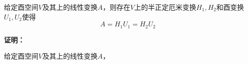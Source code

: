 
\begin{theorem}{}
给定酉空间$V$及其上的线性变换$A$，则存在$V$上的半正定厄米变换$H_1,H_2$和酉变换$U_1,U_2$使得
\begin{equation}
A=H_1U_1=H_2U_2
\end{equation}
\end{theorem}
\textbf{证明：}
\begin{theorem}{}
给定酉空间$V$及其上的线性变换$A$，
\end{theorem}
